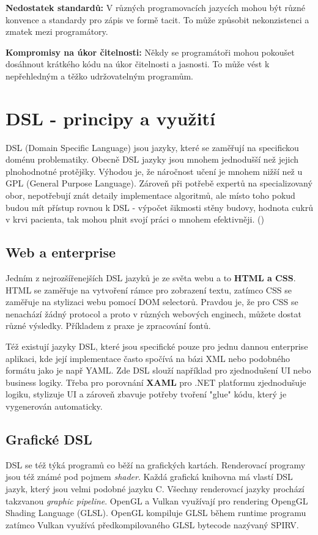 \documentclass[male,czech]{kithesis}
\begin{document}
\textbf{Nedostatek standardů:}
V různých programovacích jazycích mohou být různé konvence a 
standardy pro zápis ve formě tacit. To může způsobit nekonzistenci a zmatek mezi programátory.

\textbf{Kompromisy na úkor čitelnosti:}
Někdy se programátoři mohou pokoušet dosáhnout krátkého kódu na úkor čitelnosti a jasnosti. 
To může vést k nepřehledným a těžko udržovatelným programům.

\chapter{DSL - principy a využití}
DSL (Domain Specific Language) jsou jazyky, které se zaměřují na specifickou doménu problematiky.
Obecně DSL jazyky jsou mnohem jednodušší než jejich plnohodnotné protějšky. Výhodou je, že 
náročnost učení je mnohem nižší než u GPL (General Purpose Language). Zároveň při potřebě 
expertů na specializovaný obor, nepotřebují znát detaily 
implementace algoritmů, ale místo toho pokud budou mít přístup rovnou k DSL - výpočet šikmosti stěny budovy,
hodnota cukrů v krvi pacienta, tak mohou plnit svojí práci o mnohem efektivněji. (\cite{DomainSpecificLanguages})

\section{Web a enterprise}
Jedním z nejrozšířenejších DSL jazyků je ze světa webu a to \textbf{HTML a CSS}. HTML se zaměřuje na vytvoření rámce pro zobrazení textu,
zatímco CSS se zaměřuje na stylizaci webu pomocí DOM selectorů. Pravdou je, že pro CSS se nenachází žádný 
protocol a proto v různých webových enginech, můžete dostat různé výsledky. Příkladem z praxe je zpracování
fontů.

Též existují jazyky DSL, které jsou specifické pouze pro jednu dannou enterprise aplikaci, kde její implementace
často spočívá na bázi XML nebo podobného formátu jako je např YAML. Zde DSL slouží například pro 
zjednodušení UI nebo business logiky. Třeba pro porovnání \textbf{XAML} pro .NET platformu zjednodušuje logiku, 
stylizuje UI a zároveň zbavuje potřeby tvoření "glue" kódu, který je vygenerován automaticky.

\section{Grafické DSL}
DSL se též týká programů co běží na grafických kartách. 
Renderovací programy jsou též známé pod pojmem \textit{shader}.
Každá grafická knihovna má vlastí DSL jazyk, který jsou velmi
podobné jazyku C. Všechny renderovací jazyky prochází takzvanou 
\textit{graphic pipeline}. OpenGL a Vulkan využívají pro rendering 
OpengGL Shading Language (GLSL). OpenGL kompiluje GLSL během runtime 
programu zatímco Vulkan využívá předkompilovaného GLSL bytecode nazývaný SPIRV.
\end{document}
